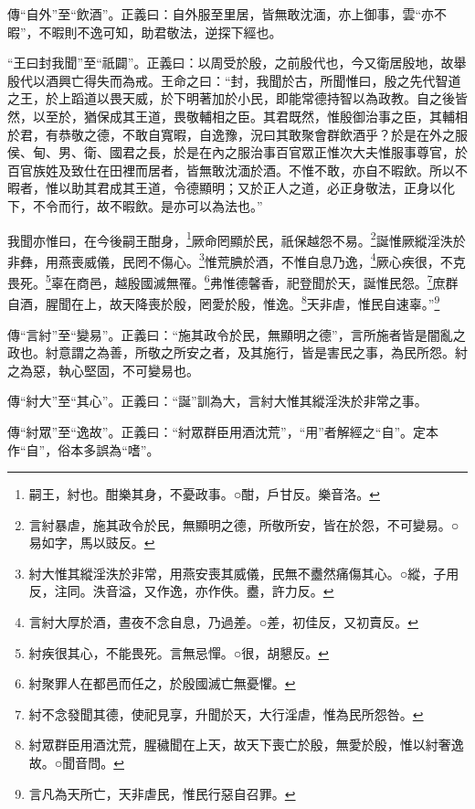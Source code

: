 {\noindent\zhuan{}\fzbyks 傳“自外”至“飲酒”。正義曰：自外服至里居，皆無敢沈湎，亦上御事，雲“亦不暇”，不暇則不逸可知，助君敬法，逆探下經也。 \par}

{\noindent\shu{}\fzkt “王曰封我聞”至“祇闢”。正義曰：以周受於殷，之前殷代也，今又衛居殷地，故舉殷代以酒興亡得失而為戒。王命之曰：“封，我聞於古，所聞惟曰，殷之先代智道之王，於上蹈道以畏天威，於下明著加於小民，即能常德持智以為政教。自之後皆然，以至於，猶保成其王道，畏敬輔相之臣。其君既然，惟殷御治事之臣，其輔相於君，有恭敬之德，不敢自寬暇，自逸豫，況曰其敢聚會群飲酒乎？於是在外之服侯、甸、男、衛、國君之長，於是在內之服治事百官眾正惟次大夫惟服事尊官，於百官族姓及致仕在田裡而居者，皆無敢沈湎於酒。不惟不敢，亦自不暇飲。所以不暇者，惟以助其君成其王道，令德顯明；又於正人之道，必正身敬法，正身以化下，不令而行，故不暇飲。是亦可以為法也。” \par}

我聞亦惟曰，在今後嗣王酣身，\footnote{嗣王，紂也。酣樂其身，不憂政事。○酣，戶甘反。樂音洛。}厥命罔顯於民，祇保越怨不易。\footnote{言紂暴虐，施其政令於民，無顯明之德，所敬所安，皆在於怨，不可變易。○易如字，馬以豉反。}誕惟厥縱淫泆於非彝，用燕喪威儀，民罔不傷心。\footnote{紂大惟其縱淫泆於非常，用燕安喪其威儀，民無不衋然痛傷其心。○縱，子用反，注同。泆音溢，又作逸，亦作佚。衋，許力反。}惟荒腆於酒，不惟自息乃逸，\footnote{言紂大厚於酒，晝夜不念自息，乃過差。○差，初佳反，又初賣反。}厥心疾很，不克畏死。\footnote{紂疾很其心，不能畏死。言無忌憚。○很，胡懇反。}辜在商邑，越殷國滅無罹。\footnote{紂聚罪人在都邑而任之，於殷國滅亡無憂懼。}弗惟德馨香，祀登聞於天，誕惟民怨。\footnote{紂不念發聞其德，使祀見享，升聞於天，大行淫虐，惟為民所怨咎。}庶群自酒，腥聞在上，故天降喪於殷，罔愛於殷，惟逸。\footnote{紂眾群臣用酒沈荒，腥穢聞在上天，故天下喪亡於殷，無愛於殷，惟以紂奢逸故。○聞音問。}天非虐，惟民自速辜。”\footnote{言凡為天所亡，天非虐民，惟民行惡自召罪。}


{\noindent\zhuan{}\fzbyks 傳“言紂”至“變易”。正義曰：“施其政令於民，無顯明之德”，言所施者皆是闇亂之政也。紂意謂之為善，所敬之所安之者，及其施行，皆是害民之事，為民所怨。紂之為惡，執心堅固，不可變易也。 \par}

{\noindent\zhuan{}\fzbyks 傳“紂大”至“其心”。正義曰：“誕”訓為大，言紂大惟其縱淫泆於非常之事。 \par}

{\noindent\zhuan{}\fzbyks 傳“紂眾”至“逸故”。正義曰：“紂眾群臣用酒沈荒”，“用”者解經之“自”。定本作“自”，俗本多誤為“嗜”。 \par}

